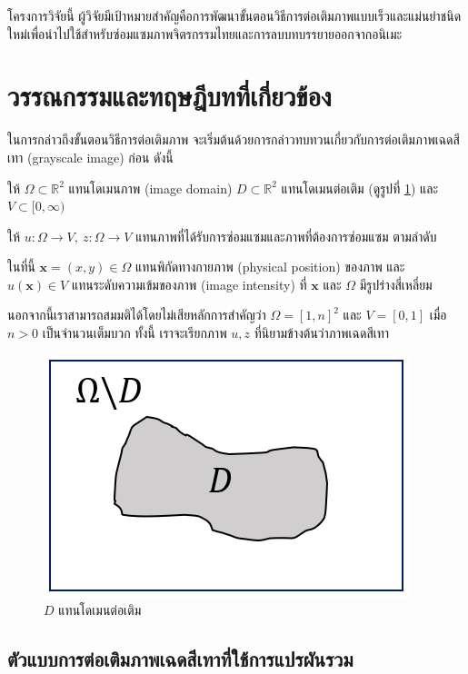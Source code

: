 \documentclass[hidelinks, a4paper,12pt]{article}
\numberwithin{equation}{section}							%
\numberwithin{equation}{section}
\begin{document}
{	\hspace{1cm} โครงการวิจัยนี้ ผู้วิจัยมีเป้าหมายสำคัญคือการพัฒนาขั้นตอนวิธีการต่อเติมภาพแบบเร็วและแม่นยำชนิดใหม่เพื่อนำไปใช้สำหรับซ่อมแซมภาพจิตรกรรมไทยและการลบบทบรรยายออกจากอนิเมะ


\section{วรรณกรรมและทฤษฎีบทที่เกี่ยวข้อง} 
\hspace{1cm} ในการกล่าวถึงขั้นตอนวิธีการต่อเติมภาพ จะเริ่มต้นด้วยการกล่าวทบทวนเกี่ยวกับการต่อเติมภาพเฉดสีเทา (grayscale image) ก่อน ดังนี้

\hspace{1cm} ให้ $\Omega \subset \mathbb{R}^2$ แทนโดเมนภาพ (image domain) $D \subset \mathbb{R}^2$ แทนโดเมนต่อเติม (ดูรูปที่ \ref{fig4}) และ $V \subset [0,\infty)$ 

\hspace{1cm} ให้ $ u: \Omega \rightarrow V,\ z: \Omega \rightarrow V$ แทนภาพที่ได้รับการซ่อมแซมและภาพที่ต้องการซ่อมแซม ตามลำดับ

\hspace{1cm} ในที่นี้ $ \mathbf{x} = (x,y) \in \Omega $ แทนพิกัดทางกายภาพ (physical position) ของภาพ และ $ u(\mathbf{x}) \in V $ แทนระดับความเข้มของภาพ (image intensity) ที่ $ \mathbf{x} $ และ $ \Omega $ มีรูปร่างสี่เหลี่ยม 

\hspace{1cm} นอกจากนี้เราสามารถสมมติได้โดยไม่เสียหลักการสำคัญว่า $ \Omega = [1,n]^2 $ และ $ V = [0,1] $ เมื่อ $n>0$ เป็นจำนวนเต็มบวก ทั้งนี้ เราจะเรียกภาพ $u,z$ ที่นิยามข้างต้นว่าภาพเฉดสีเทา
\begin{figure}[H]
	\centering
	\includegraphics[width=0.4\linewidth]{images/sample-domain.png}
	\caption{$D$ แทนโดเมนต่อเติม}
	\label{fig4}
\end{figure}

\subsection{ตัวแบบการต่อเติมภาพเฉดสีเทาที่ใช้การแปรผันรวม}\label{inpaint-model-grayscale}

}
\end{document}
